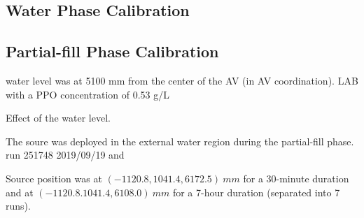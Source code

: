 \subsection{Water Phase Calibration}

\subsection{Partial-fill Phase Calibration}

water level was at 5100 mm from the center of the AV (in AV coordination).
LAB with a PPO concentration of 0.53 g/L  




Effect of the water level.







The  soure was deployed in the external water region during the partial-fill phase.
run 251748 2019/09/19 and 


Source position was at $(-1120.8, 1041.4, 6172.5)~ mm$ for a 30-minute duration and at $(-1120.8. 1041.4, 6108.0)~mm$ for a 7-hour duration (separated into 7 runs).
















